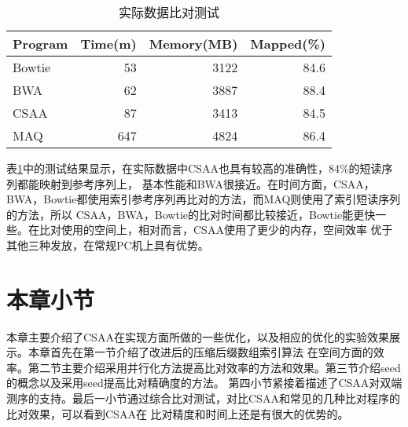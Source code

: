 \begin{table}[htbp]
    \caption{实际数据比对测试}
    \label{tab:tab3}
    \centering
    \begin{tabular}{lrrr}
       \toprule
       Program&Time(m)&Memory(MB)&Mapped(\%)\\
       \midrule
       Bowtie&53&3122&84.6\\
       BWA&62&3887&88.4\\
       CSAA&87&3413&84.5\\
       MAQ&647&4824&86.4\\
       \bottomrule
    \end{tabular}
\end{table}

表\ref{tab:tab3}中的测试结果显示，在实际数据中CSAA也具有较高的准确性，84\%的短读序列都能映射到参考序列上，
基本性能和BWA很接近。在时间方面，CSAA，BWA，Bowtie都使用索引参考序列再比对的方法，而MAQ则使用了索引短读序列的方法，所以
CSAA，BWA，Bowtie的比对时间都比较接近，Bowtie能更快一些。在比对使用的空间上，相对而言，CSAA使用了更少的内存，空间效率
优于其他三种发放，在常规PC机上具有优势。

\section{本章小节}

本章主要介绍了CSAA在实现方面所做的一些优化，以及相应的优化的实验效果展示。本章首先在第一节介绍了改进后的压缩后缀数组索引算法
在空间方面的效率。第二节主要介绍采用并行化方法提高比对效率的方法和效果。第三节介绍seed的概念以及采用seed提高比对精确度的方法。
第四小节紧接着描述了CSAA对双端测序的支持。最后一小节通过综合比对测试，对比CSAA和常见的几种比对程序的比对效果，可以看到CSAA在
比对精度和时间上还是有很大的优势的。
